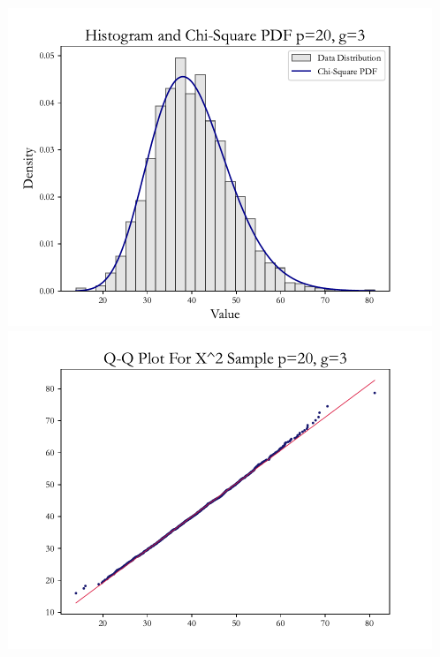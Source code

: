 \documentclass{article} %
\begin{document}
\begin{figure}[H]
    \centering
    \begin{minipage}[b]{0.49\textwidth}
        \centering
        \includegraphics[width=\textwidth]{img/b/hist_plot_p=20_g=3.pdf}
    \end{minipage}
    \hfill
    \begin{minipage}[b]{0.49\textwidth}
        \centering
        \includegraphics[width=\textwidth]{img/b/qq_plot_p=20_g=3.pdf}
    \end{minipage}
    \hfill
    \begin{minipage}[b]{0.49\textwidth}
        \centering

\end{minipage}
\end{figure}
\end{document}
